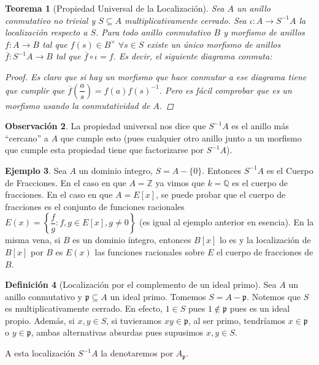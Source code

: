\documentclass[12pt]{book}
\newtheorem{teo}{Teorema}[section]
\theoremstyle{definition}
\newtheorem{obs}[teo]{Observación}
\newtheorem{defn}[teo]{Definición}
\newtheorem{ex}[teo]{Ejemplo}
\newcommand{\ZZ}{\mathbb{Z}}      %
\newcommand{\QQ}{\mathbb{Q}}
\begin{document}
\begin{teo}[Propiedad Universal de la Localización]

Sea $A$ un anillo conmutativo no trivial y $S\subseteq A$ multiplicativamente cerrado. Sea $\iota : A\to S^{-1}A$ la localización respecto a $S$. Para todo anillo conmutativo $B$ y morfismo de anillos $f:A\to B$ tal que $f(s)\in B^\times \; \forall s\in S$ existe un único morfismo de anillos $\overline{f}:S^{-1}A\to B$ tal que $\overline{f}\circ \iota = f$. Es decir, el siguiente diagrama conmuta: 
\begin{proof}
Es claro que si hay un morfismo que hace conmutar a ese diagrama tiene que cumplir que $\overline{f}\left(\dfrac{a}{s}\right) = f(a)f(s)^{-1}$. Pero es fácil comprobar que es un morfismo usando la conmutatividad de $A$.
\end{proof}
\end{teo}

\begin{obs}
La propiedad universal nos dice que $S^{-1}A$ es el anillo más "`cercano"' a $A$ que cumple esto (pues cualquier otro anillo junto a un morfismo que cumple esta propiedad tiene que factorizarse por $S^{-1}A$).
\end{obs}

\begin{ex}
Sea $A$ un dominio íntegro, $S=A-\{0\}$. Entonces $S^{-1}A$ es el Cuerpo de Fracciones. En el caso en que $A=\ZZ$ ya vimos que $k=\QQ$ es el cuerpo de fracciones. En el caso en que $A=E[x]$, se puede probar que el cuerpo de fracciones es el conjunto de funciones racionales $E(x) = \left\{\dfrac{f}{g}:f,g\in E[x], g\neq 0\right\}$ (es igual al ejemplo anterior en esencia). En la misma vena, si $B$ es un dominio íntegro, entonces $B[x]$ lo es y la localización de $B[x]$ por $B$ es $E(x)$ las funciones racionales sobre $E$ el cuerpo de fracciones de $B$.
\end{ex}

\begin{defn}[Localización por el complemento de un ideal primo]
Sea $A$ un anillo conmutativo y $\mathfrak{p}\subseteq A$ un ideal primo. Tomemos $S=A-\mathfrak{p}$. Notemos que $S$ es multiplicativamente cerrado. En efecto, $1\in S$ pues $1\notin \mathfrak{p}$ pues es un ideal propio. Además, si $x,y\in S$, si tuvieramos $xy\in \mathfrak{p}$, al ser primo, tendríamos $x\in\mathfrak{p}$ o $y\in\mathfrak{p}$, ambas alternativas absurdas pues supusimos $x,y\in S$.

A esta localización $S^{-1}A$ la denotaremos por $A_\mathfrak{p}$.
\end{defn}
\end{document}
